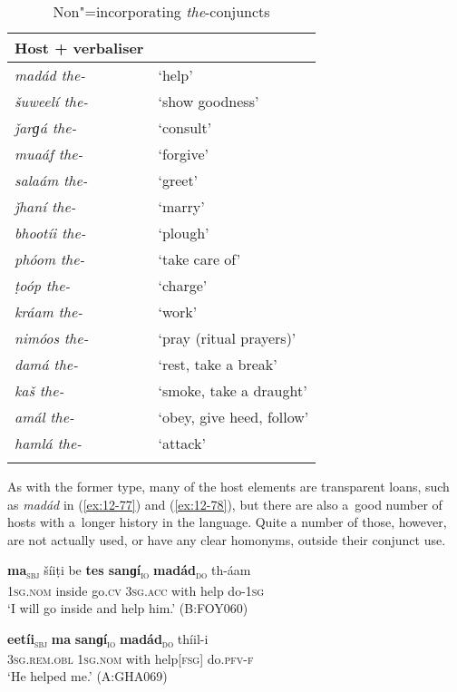 \begin{table}[ht]
\caption{Non"=incorporating \textit{the}-conjuncts}
\begin{tabularx}{.75\textwidth}{ l@{\hspace{45pt}} Q} 
\lsptoprule
Host + verbaliser &
\\\hline
\textit{madád the-} &
`help'\\
\textit{šuweelí the-} &
`show goodness'\\
\textit{ǰarɡá the-} &
`consult'\\
\textit{muaáf the-} &
`forgive'\\
\textit{salaám the-} &
`greet'\\
\textit{ǰhaní the-} &
`marry'\\
\textit{bhootíi the-} &
`plough'\\
\textit{phóom the-} &
`take care of'\\
\textit{ṭoóp the-} &
`charge'\\
\textit{kráam the-} &
`work'\\
\textit{nimóos the-} &
`pray (ritual prayers)'\\
\textit{damá the-} &
`rest, take a break'\\
\textit{kaš the-} &
`smoke, take a draught'\\
\textit{amál the-} &
`obey, give heed, follow'\\
\textit{hamlá the-} &
`attack'\\\lspbottomrule
\end{tabularx}
\label{tab:12-4}
\end{table}


As with the former type, many of the host elements are transparent loans, such as \textit{madád} in (\ref{ex:12-77}) and (\ref{ex:12-78}), but there are also a~good number of hosts with a~longer history in the language. Quite a number of those, however, are not actually used, or have any clear homonyms, outside their conjunct use.

\begin{exe}
\ex
\label{ex:12-77}
\gll {\ob}\textbf{ma}{\cb}\textsubscript{\textsc{\upshape sbj}} šíiṭi be {\ob}\textbf{tes sanɡí}{\cb}\textsubscript{\textsc{\upshape io}} {\ob}\textbf{madád}{\cb}\textsubscript{\textsc{\upshape do}} th-áam\\
\textsc{1sg.nom} inside go.\textsc{cv} \textsc{3sg.acc} with help do-\textsc{1sg}\\
\glt `I will go inside and help him.' (B:FOY060)
\end{exe}
\begin{exe}
\ex
\label{ex:12-78}
\gll {\ob}\textbf{eetíi}{\cb}\textsubscript{\textsc{\upshape sbj}} {\ob}\textbf{ma} \textbf{sanɡí}{\cb}\textsubscript{\textsc{\upshape io}} {\ob}\textbf{madád}{\cb}\textsubscript{\textsc{\upshape do}} thíil-i\\
\textsc{3sg.rem.obl} \textsc{1sg.nom} with help[\textsc{fsg]} do.\textsc{pfv-f}\\
\glt `He helped me.' (A:GHA069)
\end{exe}

